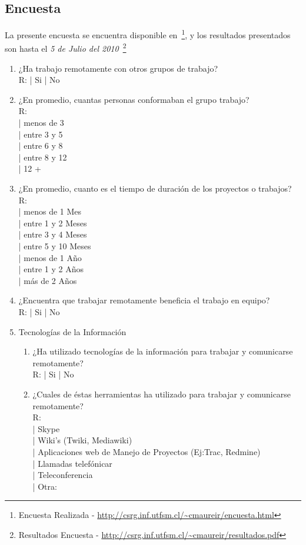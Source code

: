 \subsection{Encuesta}
La presente encuesta se encuentra disponible en~\footnote{Encuesta Realizada - \url{http://csrg.inf.utfsm.cl/~cmaureir/encuesta.html}},
y los resultados presentados son hasta el \emph{5 de Julio del 2010}~\footnote{Resultados Encuesta - \url{http://csrg.inf.utfsm.cl/~cmaureir/resultados.pdf}}
\begin{enumerate}
    \item ¿Ha trabajo remotamente con otros grupos de trabajo?\\
        R: | Si | No
    \item ¿En promedio, cuantas personas conformaban el grupo trabajo?\\
        R:\\
            | menos de 3\\
            | entre 3 y 5\\
            | entre 6 y 8\\
            | entre 8 y 12\\
            | 12 +
    \item ¿En promedio, cuanto es el tiempo de duración de los
    proyectos o trabajos?\\
        R:\\
            | menos de 1 Mes\\
            | entre 1 y 2 Meses\\
            | entre 3 y 4 Meses\\
            | entre 5 y 10 Meses\\
            | menos de 1 Año\\
            | entre 1 y 2 Años\\
            | más de 2 Años
    \item ¿Encuentra que trabajar remotamente beneficia el trabajo en
        equipo?\\
        R: | Si | No
    \item Tecnologías de la Información
    \begin{enumerate}
        \item ¿Ha utilizado tecnologías de la información para trabajar y
        comunicarse remotamente?\\
        R: | Si | No

        \item ¿Cuales de éstas herramientas ha utilizado para trabajar y
            comunicarse remotamente?\\
        R:\\
           | Skype\\
           | Wiki's (Twiki, Mediawiki)\\
           | Aplicaciones web de Manejo de Proyectos (Ej:Trac, Redmine)\\
           | Llamadas telefónicar\\
           | Teleconferencia\\
           | Otra:


\end{enumerate}
\end{enumerate}
